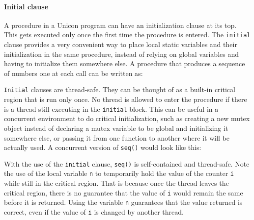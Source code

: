 \paragraph{Initial clause}

A procedure in a Unicon program can have an initialization clause at its top.
This gets executed only once the first time the procedure is entered. The
\texttt{initial} clause provides a very convenient way to place local static
variables and their initialization in the same procedure, instead of relying on
global variables and having to initialize them somewhere else.  A procedure that
produces a sequence of numbers one at each call can be written as:


\texttt{Initial} clauses are thread-safe. They can be thought of as a built-in
critical region that is run only once. No thread is allowed to enter the
procedure if there is a thread still executing in the \texttt{initial}
block. This can be useful in a concurrent environment to do critical
initialization, such as creating a new mutex object instead of declaring a mutex
variable to be global and initializing it somewhere else, or passing it from one
function to another where it will be actually used.  A concurrent version of
\texttt{seq()} would look like this:


With the use of the \texttt{initial} clause, \texttt{seq()} is self-contained
and thread-safe. Note the use of the local variable \texttt{n} to temporarily
hold the value of the counter \texttt{i} while still in the critical
region. That is because once the thread leaves the critical region, there is no
guarantee that the value of \texttt{i} would remain the same before it is
returned.  Using the variable \texttt{n} guarantees that the value returned is
correct, even if the value of \texttt{i} is changed by another thread.

